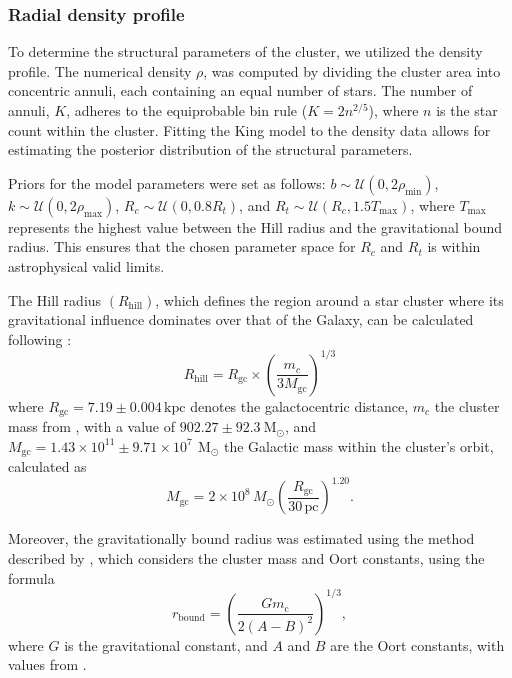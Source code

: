 \documentclass{aa}
\begin{document}
\subsubsection{Radial density profile}
To determine the structural parameters of the cluster, we utilized the \citet{1962AJ.....67..471K} density profile. The numerical density $\rho$, was computed by dividing the cluster area into concentric annuli, each containing an equal number of stars. The number of annuli, $K$, adheres to the equiprobable bin rule ($K = 2n^{2/5}$), where $n$ is the star count within the cluster. Fitting the King model to the density data allows for estimating the posterior distribution of the structural parameters.

Priors for the model parameters were set as follows: $b \sim \mathcal{U}(0, 2\rho_{\mathrm{min}})$, $k \sim \mathcal{U}(0, 2\rho_{\mathrm{max}})$, $R_c \sim \mathcal{U}(0, 0.8R_t)$, and $R_t \sim \mathcal{U}(R_c, 1.5T_{\mathrm{max}})$, where $T_{\mathrm{max}}$ represents the highest value between the Hill radius and the gravitational bound radius. This ensures that the chosen parameter space for $R_c$ and $R_t$ is within astrophysical valid limits.

The Hill radius $(R_\mathrm{hill})$, which defines the region around a star cluster where its gravitational influence dominates over that of the Galaxy, can be calculated following \citet{2019A&A...627A.119C}:
\begin{equation}
R_\mathrm{hill} = R_{\mathrm{gc}} \times \left(\frac{m_c}{3M_{\mathrm{gc}}}\right)^{1/3}
\end{equation}
where $ R_{\mathrm{gc}} = 7.19 \pm 0.004\,\mathrm{kpc} $ denotes the galactocentric distance, $ m_c $ the cluster mass from \citet{2024arXiv240305143H}, with a value of $902.27 \pm 92.3~\mathrm{M_{\odot}}$, and $ M_{\mathrm{gc}} = 1.43 \times 10^{11} \pm 9.71 \times 10^7\,~\mathrm{M_{\odot}} $ the Galactic mass within the cluster's orbit, calculated as
\begin{equation}
	M_{\mathrm{gc}} = 2  \times 10^8\,M_\odot \left(\frac{R_{\mathrm{gc}}}{30\,\mathrm{pc}}\right)^{1.20}.
\end{equation}

Moreover, the gravitationally bound radius was estimated using the method described by \citet{1998MNRAS.299..955P}, which considers the cluster mass and Oort constants, using the formula
\begin{equation}
	r_\mathrm{bound} = \left( \frac{Gm_{\mathrm{c}}}{2(A-B)^2} \right)^{1/3},
\end{equation}
where $G$ is the gravitational constant, and $A$ and $B$ are the Oort constants, with values from \citet{2017MNRAS.468L..63B}.
\end{document}
